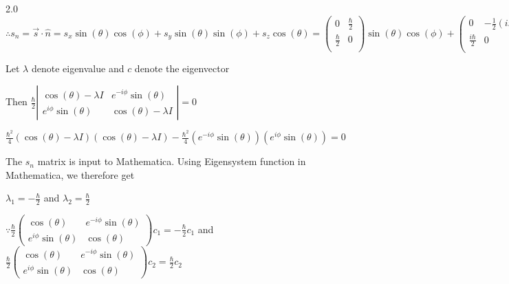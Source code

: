 \documentclass[12pt]{article}
\begin{document}
\begin{spacing}{2.0}
$\therefore s_n = \vec{s}\cdot\hat{n} = s_x\sin(\theta)\cos(\phi) + s_y\sin(\theta)\sin(\phi) + s_z \cos(\theta) = \left(
\begin{array}{cc}
 0 & \frac{\hbar }{2} \\
 \frac{\hbar }{2} & 0 \\
\end{array}
\right)\sin(\theta)\cos(\phi) + \left(
\begin{array}{cc}
 0 & -\frac{1}{2} (i \hbar ) \\
 \frac{i \hbar }{2} & 0 \\
\end{array}
\right)\sin(\theta)\sin(\phi) + \left(
\begin{array}{cc}
 \frac{\hbar }{2} & 0 \\
 0 & -\frac{\hbar }{2} \\
\end{array}
\right) \cos(\theta) = \frac{\hbar}{2} \left(
\begin{array}{cc}
\cos(\theta) & e^{-i\phi} \sin(\theta) \\
e^{i\phi} \sin(\theta) & \cos(\theta)
\end{array}
\right)$

Let $\lambda$ denote eigenvalue and $c$ denote the eigenvector

Then $\frac{\hbar}{2}\left|
\begin{array}{cc}
\cos(\theta)-\lambda I & e^{-i\phi} \sin(\theta) \\
e^{i\phi} \sin(\theta) & \cos(\theta)-\lambda I
\end{array}
\right|=0$

$\frac{\hbar^2}{4}(\cos(\theta)-\lambda I)(\cos(\theta)-\lambda I)-\frac{\hbar^2}{4}(e^{-i\phi} \sin(\theta))(e^{i\phi} \sin(\theta))=0$

The $s_n$ matrix is input to Mathematica. Using Eigensystem function in Mathematica, we therefore get

$\lambda_1=-\frac{\hbar }{2}$ and $\lambda_2=\frac{\hbar }{2}$

$\because \frac{\hbar}{2} \left(
\begin{array}{cc}
\cos(\theta) & e^{-i\phi} \sin(\theta) \\
e^{i\phi} \sin(\theta) & \cos(\theta)
\end{array}
\right)c_1 = -\frac{\hbar }{2}c_1$ and 
$\frac{\hbar}{2} \left(
\begin{array}{cc}
\cos(\theta) & e^{-i\phi} \sin(\theta) \\
e^{i\phi} \sin(\theta) & \cos(\theta)
\end{array}
\right)c_2 = \frac{\hbar }{2}c_2$


\end{spacing}
\end{document}
